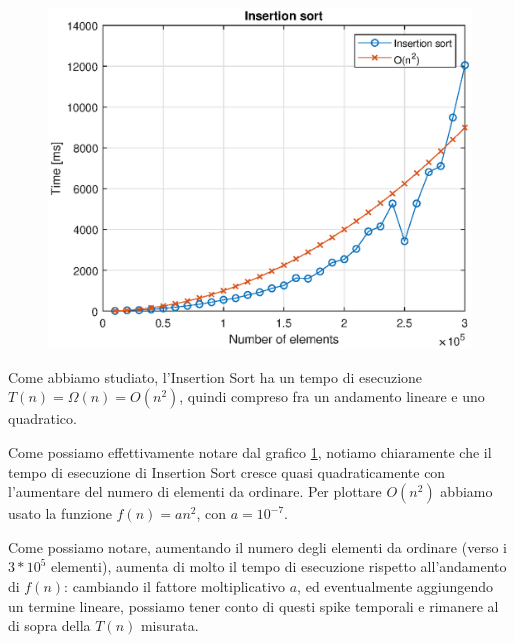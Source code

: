 \begin{figure}[h]
	\centering
	\includegraphics{./insertion/graph.eps}
	\label{ins:fig}
\end{figure}

Come abbiamo studiato, l'Insertion Sort ha un tempo di esecuzione $T(n) = \Omega(n) = O(n^2)$, quindi compreso fra un andamento lineare e uno quadratico.

Come possiamo effettivamente notare dal grafico \ref{ins:fig}, notiamo chiaramente che il tempo di esecuzione di Insertion Sort cresce quasi quadraticamente con l'aumentare del numero di elementi da ordinare.
Per plottare $O(n^{2})$ abbiamo usato la funzione $f(n) = an^{2}$, con $a=10^{-7}$.

Come possiamo notare, aumentando il numero degli elementi da ordinare (verso i $3*10^{5}$ elementi), aumenta di molto il tempo di esecuzione rispetto all'andamento di $f(n)$: cambiando il fattore moltiplicativo $a$, ed eventualmente aggiungendo un termine lineare, possiamo tener conto di questi spike temporali e rimanere al di sopra della $T(n)$ misurata.